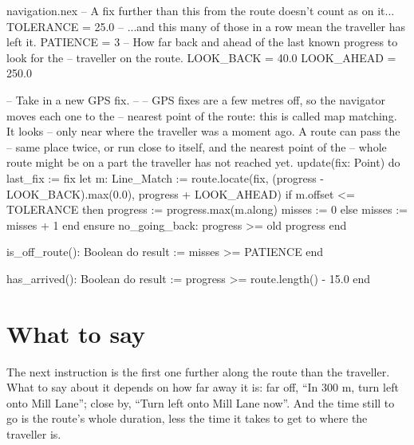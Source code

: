 \begin{continued}{navigation.nex}
  -- A fix further than this from the route doesn't count as on it...
  TOLERANCE = 25.0
  -- ...and this many of those in a row mean the traveller has left it.
  PATIENCE = 3
  -- How far back and ahead of the last known progress to look for the
  -- traveller on the route.
  LOOK_BACK = 40.0
  LOOK_AHEAD = 250.0

  -- Take in a new GPS fix.
  --
  -- GPS fixes are a few metres off, so the navigator moves each one to the
  -- nearest point of the route: this is called map matching. It looks
  -- only near where the traveller was a moment ago. A route can pass the
  -- same place twice, or run close to itself, and the nearest point of the
  -- whole route might be on a part the traveller has not reached yet.
  update(fix: Point) do
    last_fix := fix
    let m: Line_Match := route.locate(fix, (progress - LOOK_BACK).max(0.0),
      progress + LOOK_AHEAD)
    if m.offset <= TOLERANCE then
      progress := progress.max(m.along)
      misses := 0
    else
      misses := misses + 1
    end
  ensure
    no_going_back: progress >= old progress
  end

  is_off_route(): Boolean do
    result := misses >= PATIENCE
  end

  has_arrived(): Boolean do
    result := progress >= route.length() - 15.0
  end
\end{continued}

\section{What to say}

The next instruction is the first one further along the route than the
traveller. What to say about it depends on how far away it is: far off,
``In 300 m, turn left onto Mill Lane''; close by, ``Turn left onto Mill
Lane now''. And the time still to go is the route's whole duration, less
the time it takes to get to where the traveller is.

